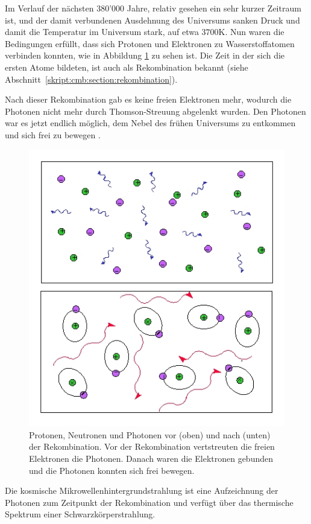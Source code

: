 Im Verlauf der nächsten 380'000 Jahre, relativ gesehen ein sehr kurzer 
Zeitraum ist, und der damit verbundenen Ausdehnung des Universums sanken Druck 
und damit die Temperatur im Universum stark, auf etwa $3700 \text{K}$.
Nun waren die Bedingungen erfüllt, dass sich Protonen und Elektronen zu 
Wasserstoffatomen verbinden konnten, wie in Abbildung \ref{fig:recombination} 
zu sehen ist. Die Zeit in der sich die ersten Atome bildeten, ist auch als 
Rekombination bekannt (siehe Abschnitt~\ref{skript:cmb:section:rekombination}).

Nach dieser Rekombination gab es keine freien Elektronen mehr, wodurch die 
Photonen nicht mehr durch Thomson-Streuung abgelenkt wurden.
Den Photonen war es jetzt endlich möglich, dem Nebel des frühen Universums zu 
entkommen und sich frei zu bewegen \cite{cmb:recombination}.
\begin{figure}
	\centering
	\includegraphics[scale=0.5]{cmb/images/recombination.jpg}
	\caption{Protonen, Neutronen und Photonen vor (oben) und nach (unten) der 
		Rekombination. Vor der Rekombination vertstreuten die freien Elektronen 
		die Photonen. Danach waren die Elektronen gebunden und die Photonen 
		konnten sich frei bewegen.}
	\label{fig:recombination}
\end{figure}
Die kosmische Mikrowellenhintergrundstrahlung ist eine Aufzeichnung der Photonen zum 
Zeitpunkt der Rekombination und verfügt über das thermische Spektrum einer Schwarzkörperstrahlung.

